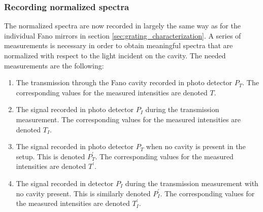 \subsubsection{Recording normalized spectra}

The normalized spectra are now recorded in largely the same way as for the individual Fano mirrors in section \ref{sec:grating_characterization}. A series of measurements is necessary in order to obtain meaningful spectra that are normalized with respect to the light incident on the cavity. The needed measurements are the following: 
\begin{enumerate}
    \item The transmission through the Fano cavity recorded in photo detector $P_T$. The corresponding values for the measured intensities are denoted $T$.
    \item The signal recorded in photo detector $P_I$ during the transmission measurement. The corresponding values for the measured intensities are denoted $T_I$.
    \item The signal recorded in photo detector $P_T$ when no cavity is present in the setup. This is denoted $P_T^{\prime}$. The corresponding values for the measured intensities are denoted $T^{\prime}$.
    \item The signal recorded in detector $P_I$ during the transmission measurement with no cavity present. This is similarly denoted $P_I^{\prime}$. The corresponding values for the measured intensities are denoted $T_I^{\prime}$.
\end{enumerate}

